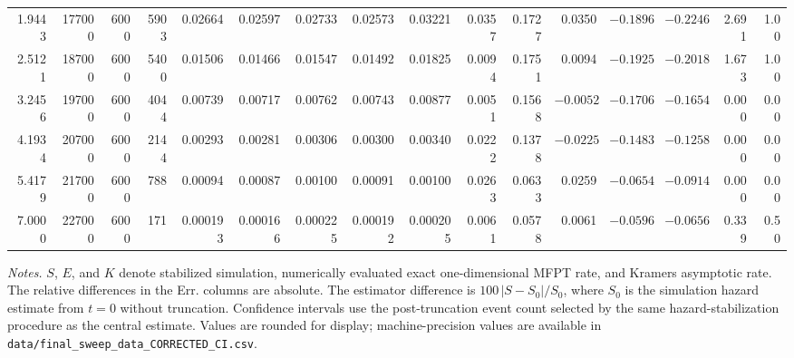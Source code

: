 \documentclass[a4paper,10pt]{article}
\begin{document}
\begin{landscape}
\begin{center}
{\begin{tabular}{@{}rrrrrrrrrrrrrrrr@{}}
1.9443 & 177000 & 6000 & 5903 & 0.02664 & 0.02597 & 0.02733 & 0.02573 & 0.03221 & 0.0357 & 0.1727 & 0.0350 & $-0.1896$ & $-0.2246$ & 2.691 & 1.00\\
2.5121 & 187000 & 6000 & 5400 & 0.01506 & 0.01466 & 0.01547 & 0.01492 & 0.01825 & 0.0094 & 0.1751 & 0.0094 & $-0.1925$ & $-0.2018$ & 1.673 & 1.00\\
3.2456 & 197000 & 6000 & 4044 & 0.00739 & 0.00717 & 0.00762 & 0.00743 & 0.00877 & 0.0051 & 0.1568 & $-0.0052$ & $-0.1706$ & $-0.1654$ & 0.000 & 0.00\\
4.1934 & 207000 & 6000 & 2144 & 0.00293 & 0.00281 & 0.00306 & 0.00300 & 0.00340 & 0.0222 & 0.1378 & $-0.0225$ & $-0.1483$ & $-0.1258$ & 0.000 & 0.00\\
5.4179 & 217000 & 6000 & 788 & 0.00094 & 0.00087 & 0.00100 & 0.00091 & 0.00100 & 0.0263 & 0.0633 & 0.0259 & $-0.0654$ & $-0.0914$ & 0.000 & 0.00\\
7.0000 & 227000 & 6000 & 171 & 0.000193 & 0.000166 & 0.000225 & 0.000192 & 0.000205 & 0.0061 & 0.0578 & 0.0061 & $-0.0596$ & $-0.0656$ & 0.339 & 0.50\\
\bottomrule
\end{tabular}
}%
\end{center}

\vspace{0.5em}
\footnotesize
\textit{Notes.} $S$, $E$, and $K$ denote stabilized simulation, numerically evaluated exact
one-dimensional MFPT rate, and Kramers asymptotic rate. The relative differences in the
\textup{Err.} columns are absolute. The estimator difference is $100\,|S-S_0|/S_0$, where
$S_0$ is the simulation hazard estimate from $t=0$ without truncation. Confidence intervals
use the post-truncation event count selected by the same hazard-stabilization procedure as the
central estimate. Values are rounded for display; machine-precision values are available in
\texttt{data/final\_sweep\_data\_CORRECTED\_CI.csv}.

\end{landscape}
\end{document}
